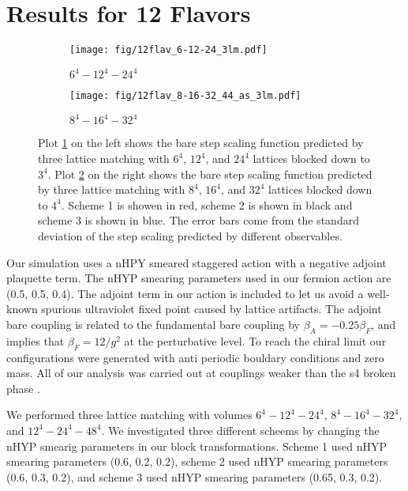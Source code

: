\documentclass{PoS}
\begin{document}
\section{Results for 12 Flavors}
\label{sec:results}
\begin{figure}[h]
  \centering
  \begin{subfigure}[b]{0.48\textwidth}
    \texttt{[image: fig/12flav\_6-12-24\_3lm.pdf]}
    \caption{$6^4-12^4-24^4$}
    \label{fig:6-12-24_33}
  \end{subfigure}
  \begin{subfigure}[b]{0.48\textwidth}
    \texttt{[image: fig/12flav\_8-16-32\_44\_as\_3lm.pdf]}
    \caption{$8^4-16^4-32^4$}
    \label{fig:8-16-32_44}
  \end{subfigure}
  \caption{Plot \ref{fig:6-12-24_33} on the left shows the bare step scaling function predicted by three lattice matching with $6^4$, $12^4$, and $24^4$ lattices blocked down to $3^4$.  Plot \ref{fig:8-16-32_44} on the right shows the bare step scaling function predicted by three lattice matching with $8^4$, $16^4$, and $32^4$ lattices blocked down to $4^4$.  Scheme 1 is showen in red, scheme 2 is shown in black and scheme 3 is shown in blue.  The error bars come from the standard deviation of the step scaling predicted by different observables.}
\label{fig:multischeme}
\end{figure}

Our simulation uses a nHPY smeared staggered action with a negative adjoint plaquette term.
The nHYP smearing parameters used in our fermion action are (0.5, 0.5, 0.4).
The adjoint term in our action is included to let us avoid a well-known spurious ultraviolet fixed point caused by lattice artifacts.
The adjoint bare coupling is related to the fundamental bare coupling by $\beta_A=-0.25\beta_F$, and implies that $\beta_F=12/g^2$ at the perturbative level.
To reach the chiral limit our configurations were generated with anti periodic bouldary conditions and zero mass.
All of our analysis was carried out at couplings weaker than the s4 broken phase \cite{}.

We performed three lattice matching with volumes $6^4-12^4-24^4$, $8^4-16^4-32^4$, and $12^4-24^4-48^4$.
We investigated three different scheems by changing the nHYP smearig parameters in our block transformations.
Scheme 1 used nHYP smearing parameters (0.6, 0.2, 0.2), scheme 2 used nHYP smearing parameters (0.6, 0.3, 0.2), and scheme 3 used nHYP smearing parameters (0.65, 0.3, 0.2).
\end{document}
